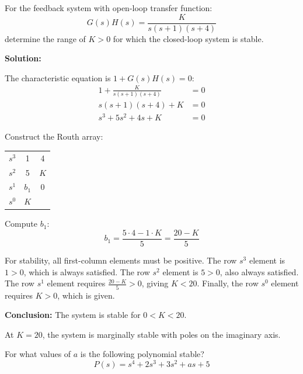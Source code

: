 \begin{examplebox}
For the feedback system with open-loop transfer function:
\begin{equation*}
G(s)H(s) = \frac{K}{s(s+1)(s+4)}
\end{equation*}
determine the range of $K > 0$ for which the closed-loop system is stable.

\textbf{Solution:}

The characteristic equation is $1 + G(s)H(s) = 0$:
\begin{align*}
1 + \frac{K}{s(s+1)(s+4)} &= 0 \\
s(s+1)(s+4) + K &= 0 \\
s^3 + 5s^2 + 4s + K &= 0
\end{align*}

Construct the Routh array:
\begin{center}
\begin{tabular}{c|cc}
\toprule
$s^3$ & 1 & 4 \\
$s^2$ & 5 & $K$ \\
$s^1$ & $b_1$ & 0 \\
$s^0$ & $K$ & \\
\bottomrule
\end{tabular}
\end{center}

Compute $b_1$:
\begin{equation*}
b_1 = \frac{5 \cdot 4 - 1 \cdot K}{5} = \frac{20 - K}{5}
\end{equation*}

For stability, all first-column elements must be positive. The row $s^3$ element is $1 > 0$, which is always satisfied. The row $s^2$ element is $5 > 0$, also always satisfied. The row $s^1$ element requires $\frac{20-K}{5} > 0$, giving $K < 20$. Finally, the row $s^0$ element requires $K > 0$, which is given.

\textbf{Conclusion:} The system is stable for $\boxed{0 < K < 20}$.

At $K = 20$, the system is marginally stable with poles on the imaginary axis.
\end{examplebox}

\vspace{1em}

\begin{example}
\label{ex:fourth_order}
For what values of $a$ is the following polynomial stable?
\begin{equation*}
P(s) = s^4 + 2s^3 + 3s^2 + as + 5
\end{equation*}
\end{example}

